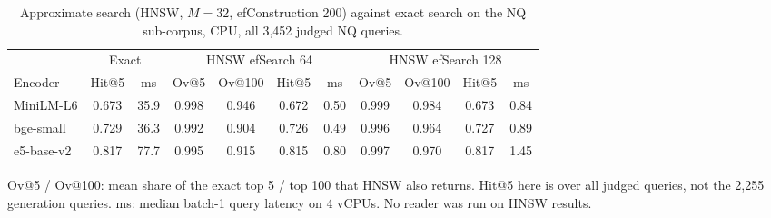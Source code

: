 \begin{table}[t]
\centering
\footnotesize
\caption{Approximate search (HNSW, $M{=}32$, efConstruction 200) against exact search on the NQ sub-corpus, CPU, all 3,452 judged NQ queries.}
\label{tab:hnsw}
\begin{tabular}{lcccccccccc}
\toprule
& \multicolumn{2}{c}{Exact} & \multicolumn{4}{c}{HNSW efSearch 64} & \multicolumn{4}{c}{HNSW efSearch 128} \\ \cmidrule(lr){2-3}\cmidrule(lr){4-7}\cmidrule(lr){8-11} Encoder & Hit@5 & ms & Ov@5 & Ov@100 & Hit@5 & ms & Ov@5 & Ov@100 & Hit@5 & ms \\
\midrule
MiniLM-L6 & 0.673 & 35.9 & 0.998 & 0.946 & 0.672 & 0.50 & 0.999 & 0.984 & 0.673 & 0.84 \\
bge-small & 0.729 & 36.3 & 0.992 & 0.904 & 0.726 & 0.49 & 0.996 & 0.964 & 0.727 & 0.89 \\
e5-base-v2 & 0.817 & 77.7 & 0.995 & 0.915 & 0.815 & 0.80 & 0.997 & 0.970 & 0.817 & 1.45 \\
\bottomrule
\end{tabular}
\par\smallskip\parbox{\linewidth}{\footnotesize Ov@5 / Ov@100: mean share of the exact top 5 / top 100 that HNSW also returns. Hit@5 here is over all judged queries, not the 2,255 generation queries. ms: median batch-1 query latency on 4 vCPUs. No reader was run on HNSW results.}
\end{table}
